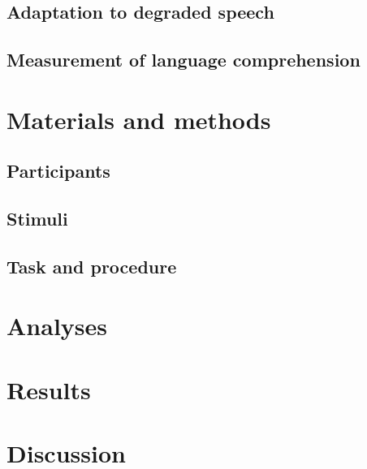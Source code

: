 \documentclass[a4paper, nobind]{templates/ociamthesis}
\begin{document}
\hypertarget{adaptation-to-degraded-speech}{%
\subsection{Adaptation to degraded speech}\label{adaptation-to-degraded-speech}}

\hypertarget{measurement-of-language-comprehension-1}{%
\subsection{Measurement of language comprehension}\label{measurement-of-language-comprehension-1}}

\hypertarget{materials-and-methods-2}{%
\section{Materials and methods}\label{materials-and-methods-2}}

\hypertarget{participants-2}{%
\subsection{Participants}\label{participants-2}}

\hypertarget{stimuli-2}{%
\subsection{Stimuli}\label{stimuli-2}}

\hypertarget{task-and-procedure-2}{%
\subsection{Task and procedure}\label{task-and-procedure-2}}

\hypertarget{analyses-2}{%
\section{Analyses}\label{analyses-2}}

\hypertarget{results-2}{%
\section{Results}\label{results-2}}

\hypertarget{discussion-1}{%
\section{Discussion}\label{discussion-1}}
\end{document}
